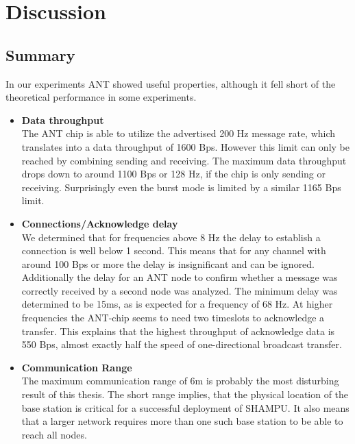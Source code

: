 \chapter{Discussion}
\section{Summary}


In our experiments ANT showed useful properties, although it fell short of the theoretical performance in some experiments.

\begin{itemize}
	\item{\textbf{Data throughput}} \hfill \\ 
	The ANT chip is able to utilize the advertised 200 Hz message rate, which translates into a data throughput of 1600 Bps. However this limit can only be reached by combining sending and receiving. The maximum data throughput drops down to around 1100 Bps or 128 Hz, if the chip is only sending or receiving. Surprisingly even the burst mode is limited by a similar 1165 Bps limit.
	
	\item{\textbf{Connections/Acknowledge delay}} \hfill \\ 
	We determined that for frequencies above 8 Hz the delay to establish a connection is well below 1 second. This means that for any channel with around 100 Bps or more the delay is insignificant and can be ignored. \\
	Additionally the delay for an ANT node to confirm whether a message was correctly received by a second node was analyzed. The minimum delay was determined to be 15ms, as is expected for a frequency of 68 Hz. At higher frequencies the ANT-chip seems to need two timeslots to acknowledge a transfer. This explains that the highest throughput of acknowledge data is 550 Bps, almost exactly half the speed of one-directional broadcast transfer.
	
	\item{\textbf{Communication Range}} \hfill \\ The maximum communication range of 6m is probably the most disturbing result of this thesis. The short range implies, that the physical location of the base station is critical for a successful deployment of SHAMPU. It also means that a larger network requires more than one such base station to be able to reach all nodes. 
\end{itemize}

